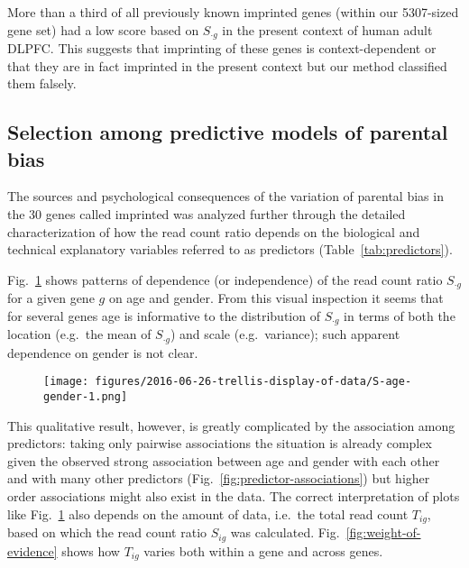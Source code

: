 \documentclass[letterpaper]{article}
\begin{document}
More than a third of
all previously known imprinted genes (within our 5307-sized gene set) had a low score
based on \(S_{\cdot g}\) in the present context of human adult DLPFC.  This
suggests that imprinting of these genes is context-dependent or that they are
in fact imprinted in the present context but our method classified them
falsely.

\subsection{Selection among predictive models of parental bias}
\label{sec:results-regression}

The sources and psychological consequences of the variation of parental bias
in the 30 genes called imprinted was analyzed further through the detailed
characterization of how the read count ratio depends on the biological and
technical explanatory variables referred to as predictors
(Table~\ref{tab:predictors}).

Fig.~\ref{fig:S-age-gender} shows patterns of dependence (or independence) of
the read count ratio \(S_{\cdot g}\) for a given gene \(g\) on age and gender.  From
this visual inspection it seems that for several genes age is informative to
the distribution of \(S_{\cdot g}\) in terms of both the location (e.g.~the mean of
\(S_{\cdot g}\)) and scale (e.g.~variance); such apparent dependence on gender is not
clear.

\begin{figure}
\begin{center}
\texttt{[image: figures/2016-06-26-trellis-display-of-data/S-age-gender-1.png]}
\caption{}
\label{fig:S-age-gender}
\end{center}
\end{figure}

This qualitative result, however, is greatly complicated by the association
among predictors: taking only pairwise associations the situation is already
complex given the observed strong association between age and gender with each
other and with many other predictors (Fig.~\ref{fig:predictor-associations})
but higher order associations might also exist in the data.
The correct interpretation of plots like Fig.~\ref{fig:S-age-gender} also depends on
the amount of data, i.e.~the total read count \(T_{ig}\), based on which the
read count ratio \(S_{ig}\) was calculated.  Fig.~\ref{fig:weight-of-evidence}
shows how \(T_{ig}\) varies both within a gene and across genes.
\end{document}
